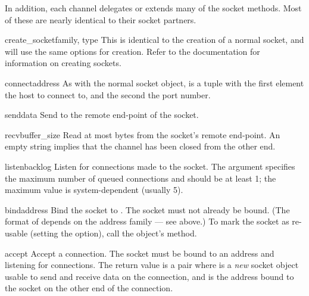 In addition, each channel delegates or extends many of the socket methods.
Most of these are nearly identical to their socket partners.

\begin{methoddesc}{create_socket}{family, type}
  This is identical to the creation of a normal socket, and 
  will use the same options for creation.  Refer to the
   documentation for information on creating
  sockets.
\end{methoddesc}

\begin{methoddesc}{connect}{address}
  As with the normal socket object,  is a 
  tuple with the first element the host to connect to, and the 
  second the port number.
\end{methoddesc}

\begin{methoddesc}{send}{data}
  Send  to the remote end-point of the socket.
\end{methoddesc}

\begin{methoddesc}{recv}{buffer_size}
  Read at most  bytes from the socket's remote end-point.
  An empty string implies that the channel has been closed from the other
  end.
\end{methoddesc}

\begin{methoddesc}{listen}{backlog}
  Listen for connections made to the socket.  The 
  argument specifies the maximum number of queued connections
  and should be at least 1; the maximum value is
  system-dependent (usually 5).
\end{methoddesc}

\begin{methoddesc}{bind}{address}
  Bind the socket to .  The socket must not already be
  bound.  (The format of  depends on the address family
  --- see above.)  To mark the socket as re-usable (setting the
   option), call the 
  object's  method.
\end{methoddesc}

\begin{methoddesc}{accept}{}
  Accept a connection.  The socket must be bound to an address
  and listening for connections.  The return value is a pair
   where  is a
  \emph{new} socket object usable to send and receive data on
  the connection, and  is the address bound to the
  socket on the other end of the connection.
\end{methoddesc}


